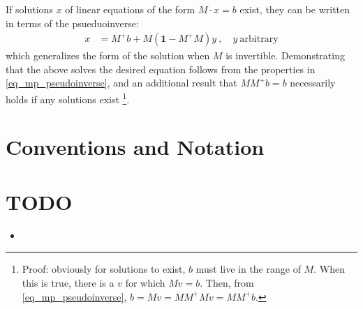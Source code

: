 \documentclass[11pt]{article}
\begin{document}
If solutions $ x $ of linear equations of the form $ M \cdot x = b $ exist, they can be written in terms of the
psueduoinverse:
\begin{align}
    x &= M ^{ +}b + M \left ( \mathbf{1} - M ^{ + }M \right )y \ , \quad y \ \mathrm{arbitrary}
\end{align}
which generalizes the form of the solution when $ M $ is invertible. Demonstrating that the above
solves the desired equation follows from the properties in \eqref{eq_mp_pseudoinverse}, and an
additional result that $   MM ^{ + }b = b$ necessarily holds if any solutions exist \footnote{Proof:
obviously for solutions to exist, $ b $ must live in the range of $ M $. When this is true, there is
a $ v $ for which $ Mv=b $. Then, from \eqref{eq_mp_pseudoinverse}, $b= Mv=M M ^{ + } M v= M M ^{ +
}b $.}.

\appendix


\section{Conventions and Notation}\label{app_conventions}



 \section{TODO}


 \begin{itemize}
 \item
 \end{itemize}



\end{document}
